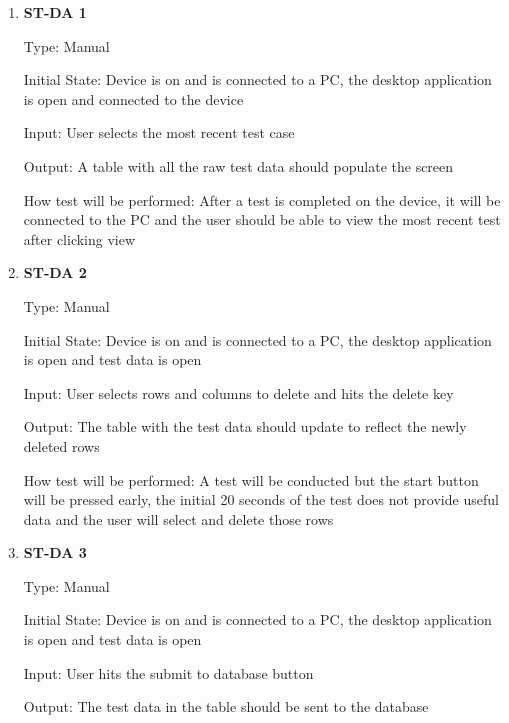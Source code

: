 \documentclass[12pt, titlepage]{article}
\begin{document}
\begin{enumerate}
  
  \item{\bf{ST-DA 1}}
  
  Type: Manual
            
  Initial State: Device is on and is connected to a PC, the desktop application is open and connected to the device
            
  Input: User selects the most recent test case
            
  Output: A table with all the raw test data should populate the screen
  
            
  How test will be performed: After a test is completed on the device, it will be connected to the PC and the user should be able to view the most recent test after clicking view\\

  \item{\bf{ST-DA 2}}
  
  Type: Manual
            
  Initial State: Device is on and is connected to a PC, the desktop application is open and test data is open
            
  Input: User selects rows and columns to delete and hits the delete key
            
  Output: The table with the test data should update to reflect the newly deleted rows
  
            
  How test will be performed: A test will be conducted but the start button will be pressed early, the initial 20 seconds of the test does not provide useful data and the user will select and delete those rows\\

  \item{\bf{ST-DA 3}}
  
  Type: Manual
            
  Initial State: Device is on and is connected to a PC, the desktop application is open and test data is open
            
  Input: User hits the submit to database button
            
  Output: The test data in the table should be sent to the database
  

\end{enumerate}
\end{document}
